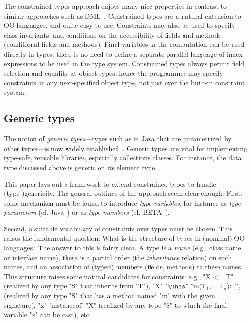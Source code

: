The constrained types approach enjoys many nice properties in contrast
to similar approaches such as DML~\cite{xi99dependent}.  Constrained
types are a natural extension to OO languages, and quite easy to
use. Constraints may also be used to specify class invariants, and
conditions on the accessibility of fields and methods (conditional
fields and methods).  Final variables in the computation can be used
directly in types; there is no need to define a separate
parallel language of index expressions to be used in the type system.
Constrained types always
permit field selection and equality at object types; hence the
programmer may specify constraints at any user-specified object type,
not just over the built-in constraint system.  

\subsection{Generic types}
The notion of \emph{generic types}---types such as  in
Java that are parametrized by other types---is now widely
established~\cite{clu,ada,GJ,java-popl97,thorup97,Java3,csharp-generics}.
Generic types are vital for implementing type-safe, reusable
libraries, especially collections classes.  For instance, the data
type  discussed above is generic on its element type.

This paper lays out a framework to extend constrained types to handle
(type-)genericity. The general outlines of the approach seem clear
enough. First, some mechanism must be found to introduce {\em type
variables}, for instance as {\em type parameters} (cf.
Java~\cite{Java3}) or as
{\em type members} (cf. BETA~\cite{beta}). 

Second, a suitable vocabulary of constraints over types must be
chosen. This raises the fundamental question: What is the structure of
types in (nominal) OO languages?  The answer to this is fairly
clear. A type is a {\em name} (e.g., class name or interface name),
there is a partial order (the {\em inheritance} relation) on such
names, and an association of (typed) members (fields, methods) to
these names. This structure raises some natural candidates for
constraints: e.g., \xcd"X <= T" (realized by any type \xcd"S" that
inherits from \xcd"T"), \xcd"X" \xcdmath"$\uhas$"
\xcdmath"m(T$_1$,$\ldots$,T$_n$):T", (realized by
any type \xcd"S" that has a method named \xcd"m" with the given
signature), \xcd"x" \xcd"instanceof" \xcd"X" (realized by any type
\xcd"S" to which the final variable 
\xcd"x" can be cast), etc. 

